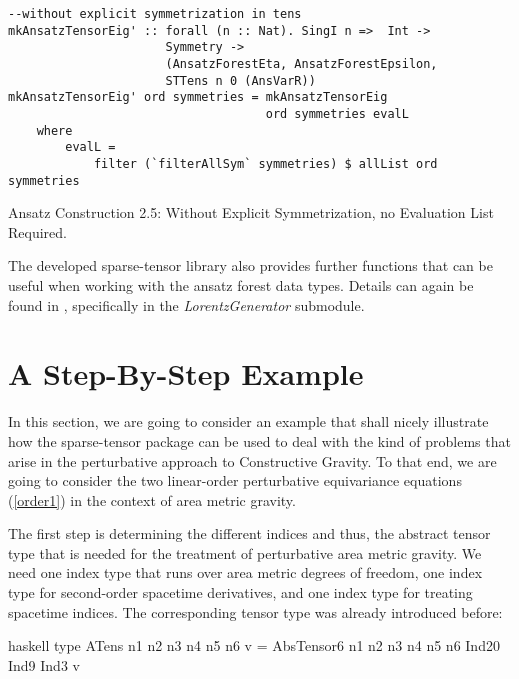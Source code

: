 \begin{listing}[hbt!]
\begin{verbatim}
--without explicit symmetrization in tens
mkAnsatzTensorEig' :: forall (n :: Nat). SingI n =>  Int ->
                      Symmetry ->
                      (AnsatzForestEta, AnsatzForestEpsilon,
                      STTens n 0 (AnsVarR))
mkAnsatzTensorEig' ord symmetries = mkAnsatzTensorEig
                                    ord symmetries evalL
    where
        evalL =
            filter (`filterAllSym` symmetries) $ allList ord symmetries
\end{verbatim} 
\caption{Ansatz Construction 2.5: Without Explicit Symmetrization, no Evaluation List Required.}\label{mkAnsatzEig2'}
\end{listing}

The developed sparse-tensor library also provides further functions that can be useful when working with the ansatz forest data types. Details can again be found in \cite{sparse-tensor}, specifically in the \textit{LorentzGenerator} submodule. 

\section{A Step-By-Step Example}
In this section, we are going to consider an example that shall nicely illustrate how the sparse-tensor package can be used to deal with the kind of problems that arise in the perturbative approach to Constructive Gravity. To that end, we are going to consider the two linear-order perturbative equivariance equations (\ref{order1}) in the context of area metric gravity. 

The first step is determining the different indices and thus, the abstract tensor type that is needed for the treatment of perturbative area metric gravity. 
We need one index type that runs over area metric degrees of freedom, one index type for second-order spacetime derivatives, and one index type for treating spacetime indices. The corresponding tensor type was already introduced before:

\begin{center}
\begin{cminted}{haskell}
type ATens n1 n2 n3 n4 n5 n6 v = 
     AbsTensor6 n1 n2 n3 n4 n5 n6 Ind20 Ind9 Ind3 v
\end{cminted}
\end{center}

